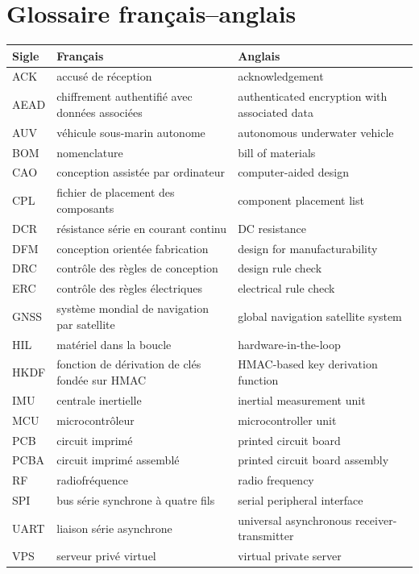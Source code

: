 \chapter*{Glossaire français--anglais}

\begin{longtable}{@{}>{\raggedright\arraybackslash}p{}>{\raggedright\arraybackslash}p{}>{\raggedright\arraybackslash}p{}@{}}
\toprule
\textbf{Sigle} & \textbf{Français} & \textbf{Anglais} \\
\midrule
\endhead
ACK & accusé de réception & acknowledgement \\
AEAD & chiffrement authentifié avec données associées & authenticated encryption with associated data \\
AUV & véhicule sous-marin autonome & autonomous underwater vehicle \\
BOM & nomenclature & bill of materials \\
CAO & conception assistée par ordinateur & computer-aided design \\
CPL & fichier de placement des composants & component placement list \\
DCR & résistance série en courant continu & DC resistance \\
DFM & conception orientée fabrication & design for manufacturability \\
DRC & contrôle des règles de conception & design rule check \\
ERC & contrôle des règles électriques & electrical rule check \\
GNSS & système mondial de navigation par satellite & global navigation satellite system \\
HIL & matériel dans la boucle & hardware-in-the-loop \\
HKDF & fonction de dérivation de clés fondée sur HMAC & HMAC-based key derivation function \\
IMU & centrale inertielle & inertial measurement unit \\
MCU & microcontrôleur & microcontroller unit \\
PCB & circuit imprimé & printed circuit board \\
PCBA & circuit imprimé assemblé & printed circuit board assembly \\
RF & radiofréquence & radio frequency \\
SPI & bus série synchrone à quatre fils & serial peripheral interface \\
UART & liaison série asynchrone & universal asynchronous receiver-transmitter \\
VPS & serveur privé virtuel & virtual private server \\
\bottomrule
\end{longtable}
